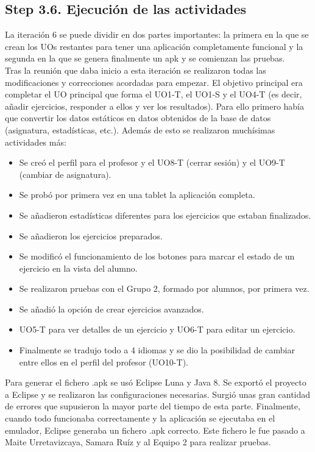 \subsection{Step 3.6. Ejecución de las actividades}
\label{it6:3.6}

La iteración 6 se puede dividir en dos partes importantes: la primera en la que se crean los UOs restantes para tener una aplicación completamente funcional y la segunda en la que se genera finalmente un apk y se comienzan las pruebas.\\

Tras la reunión que daba inicio a esta iteración se realizaron todas las modificaciones y correcciones acordadas para empezar. El objetivo principal era completar el UO principal que forma el UO1-T, el UO1-S y el UO4-T (es decir, añadir ejercicios, responder a ellos y ver los resultados). Para ello primero había que convertir los datos estáticos en datos obtenidos de la base de datos (asignatura, estadísticas, etc.). Además de esto se realizaron muchísimas actividades más:

\begin{itemize}
\item Se creó el perfil para el profesor y el UO8-T (cerrar sesión) y el UO9-T (cambiar de asignatura).
\item Se probó por primera vez en una tablet la aplicación completa.
\item Se añadieron estadísticas diferentes para los ejercicios que estaban finalizados.
\item Se añadieron los ejercicios preparados.
\item Se modificó el funcionamiento de los botones para marcar el estado de un ejercicio en la vista del alumno.
\item Se realizaron pruebas con el Grupo 2, formado por alumnos, por primera vez.
\item Se añadió la opción de crear ejercicios avanzados.
\item UO5-T para ver detalles de un ejercicio y UO6-T para editar un ejercicio.
\item Finalmente se tradujo todo a 4 idiomas y se dio la posibilidad de cambiar entre ellos en el perfil del profesor (UO10-T).
\end{itemize}

Para generar el fichero .apk se usó Eclipse Luna y Java 8. Se exportó el proyecto a Eclipse y se realizaron las configuraciones necesarias. Surgió unas gran cantidad de errores que supusieron la mayor parte del tiempo de esta parte. Finalmente, cuando todo funcionaba correctamente y la aplicación se ejecutaba en el emulador, Eclipse generaba un fichero .apk correcto. Este fichero le fue pasado a Maite Urretavizcaya, Samara Ruíz y al Equipo 2 para realizar pruebas.\\

